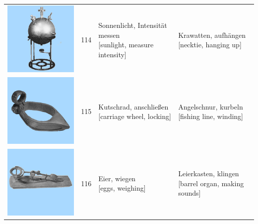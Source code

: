\documentclass[
  english,
  man,floatsintext]{apa7}
\begin{document}
\begin{center}
\begin{ThreePartTable}
{\begin{longtable}{llll}
\includegraphics[valign=c, scale=0.23]{../materials/unfamiliar/114.png} & 114 & \makecell[l]{Sonnenlicht, Intensität messen\\{[sunlight, measure intensity]}} & \makecell[l]{Krawatten, aufhängen\\{[necktie, hanging up]}}\\
\includegraphics[valign=c, scale=0.23]{../materials/unfamiliar/115.png} & 115 & \makecell[l]{Kutschrad, anschließen\\{[carriage wheel, locking]}} & \makecell[l]{Angelschnur, kurbeln\\{[fishing line, winding]}}\\
\includegraphics[valign=c, scale=0.23]{../materials/unfamiliar/116.png} & 116 & \makecell[l]{Eier, wiegen\\{[eggs, weighing]}} & \makecell[l]{Leierkasten, klingen\\{[barrel organ, making sounds]}}\\

\end{longtable}}
\end{ThreePartTable}
\end{center}
\end{document}
